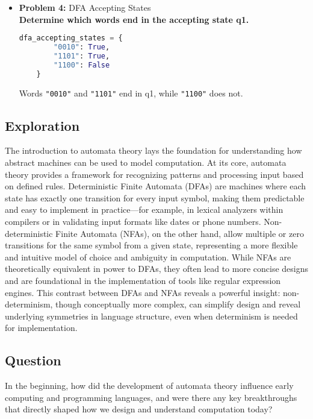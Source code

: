 \documentclass[11pt]{article}
\begin{document}
\begin{itemize}[leftmargin=*]
    \item \textbf{Problem 4:} DFA Accepting States
    \\ \textbf{Determine which words end in the accepting state q1.}

    \begin{lstlisting}[language=Python]
        dfa_accepting_states = {
        "0010": True,
        "1101": True,
        "1100": False
    }
        \end{lstlisting}

Words \texttt{"0010"} and \texttt{"1101"} end in q1, while \texttt{"1100"} does not.
    
\end{itemize}

\subsection{Exploration}
The introduction to automata theory lays the foundation for understanding how abstract machines can be used to model computation. At its core, automata theory provides a framework for recognizing patterns and processing input based on defined rules. Deterministic Finite Automata (DFAs) are machines where each state has exactly one transition for every input symbol, making them predictable and easy to implement in practice—for example, in lexical analyzers within compilers or in validating input formats like dates or phone numbers. Non-deterministic Finite Automata (NFAs), on the other hand, allow multiple or zero transitions for the same symbol from a given state, representing a more flexible and intuitive model of choice and ambiguity in computation. While NFAs are theoretically equivalent in power to DFAs, they often lead to more concise designs and are foundational in the implementation of tools like regular expression engines. This contrast between DFAs and NFAs reveals a powerful insight: non-determinism, though conceptually more complex, can simplify design and reveal underlying symmetries in language structure, even when determinism is needed for implementation.

\subsection{Question}
In the beginning, how did the development of automata theory influence early computing and programming languages, and were there any key breakthroughs that directly shaped how we design and understand computation today?
\end{document}
